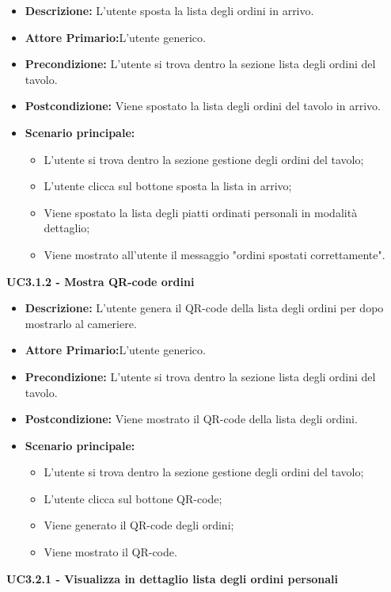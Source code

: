 \begin{itemize}
    \item \textbf{Descrizione:} L'utente sposta la lista degli ordini in arrivo.
    \item \textbf{Attore Primario:}L'utente generico.
    \item \textbf{Precondizione:} L'utente si trova dentro la sezione lista degli ordini del tavolo.
    \item \textbf{Postcondizione:} Viene spostato la lista degli ordini del tavolo in arrivo.
    \item \textbf{Scenario principale:}
    \begin{itemize}
        \item L'utente si trova dentro la sezione gestione degli ordini del tavolo;
        \item L'utente clicca sul bottone sposta la lista in arrivo;
        \item Viene spostato la lista degli piatti ordinati personali in modalità dettaglio;
        \item Viene mostrato all'utente il messaggio "ordini spostati correttamente".
    \end{itemize}
\end{itemize}
\textbf{UC3.1.2 - Mostra QR-code ordini}
\begin{itemize}
    \item \textbf{Descrizione:} L'utente genera il QR-code della lista degli ordini per dopo mostrarlo al cameriere.
    \item \textbf{Attore Primario:}L'utente generico.
    \item \textbf{Precondizione:} L'utente si trova dentro la sezione lista degli ordini del tavolo.
    \item \textbf{Postcondizione:} Viene mostrato il QR-code della lista degli ordini.
    \item \textbf{Scenario principale:}
    \begin{itemize}
        \item L'utente si trova dentro la sezione gestione degli ordini del tavolo;
        \item L'utente clicca sul bottone QR-code;
        \item Viene generato il QR-code degli ordini;
        \item Viene mostrato il QR-code.
    \end{itemize}
\end{itemize}
\textbf{UC3.2.1 - Visualizza in dettaglio lista degli ordini personali}
